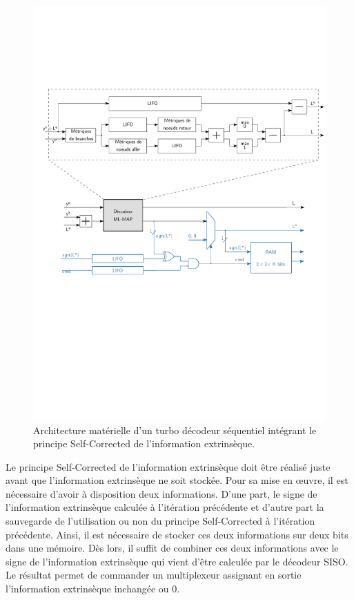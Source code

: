 \begin{figure}[!t]
	\centering
	\includegraphics[width=\textwidth]{main/ch2_fig/ipe/sc_arch3.pdf}
	\vspace*{.3cm}
	\caption{\label{fig:sc_arch}Architecture matérielle d'un turbo décodeur séquentiel intégrant le principe Self-Corrected de l'information 
	extrinsèque.}
\end{figure}

Le principe Self-Corrected de l’information extrinsèque doit être réalisé juste avant que l'information extrinsèque ne soit stockée. 
Pour sa mise en œuvre, il est nécessaire d'avoir à disposition deux informations. D'une part, le signe de l'information 
extrinsèque calculée à l'itération précédente et d'autre part la sauvegarde de l'utilisation ou non du principe Self-Corrected à 
l'itération précédente. Ainsi, il est nécessaire de stocker ces deux informations sur deux bits dans une mémoire. Dès lors, 
il suffit de combiner ces deux informations avec le signe de l'information extrinsèque qui vient d'être 
calculée par le décodeur SISO. Le résultat permet de commander un multiplexeur assignant en sortie l'information extrinsèque 
inchangée ou 0.


